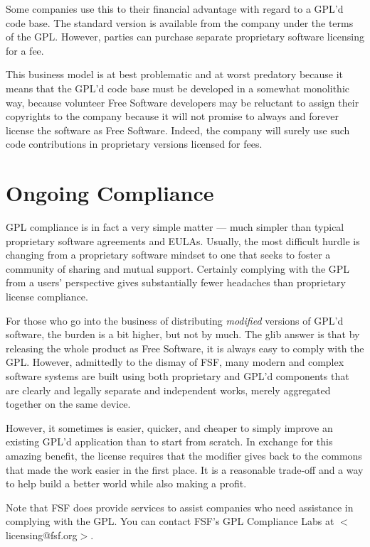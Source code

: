 Some companies use this to their
financial advantage with regard to a GPL'd code base. The standard
version is available from the company under the terms of the GPL\@.
However, parties can purchase separate proprietary software licensing for
a fee.

This business model is at best problematic and at worst predatory because it means that the GPL'd code
base must be developed in a somewhat monolithic way, because volunteer
Free Software developers may be reluctant to assign their copyrights to
the company because it will not promise to always and forever license the
software as Free Software. Indeed, the company will surely use such code
contributions in proprietary versions licensed for fees.

\section{Ongoing Compliance}

GPL compliance is in fact a very simple matter --- much simpler than
typical proprietary software agreements and EULAs. Usually, the most
difficult hurdle is changing from a proprietary software mindset to one
that seeks to foster a community of sharing and mutual support. Certainly
complying with the GPL from a users' perspective gives substantially fewer
headaches than proprietary license compliance.

For those who go into the business of distributing {\em modified}
versions of GPL'd software, the burden is a bit higher, but not by
much. The glib answer is that by releasing the whole product as Free
Software, it is always easy to comply with the GPL. However,
admittedly to the dismay of FSF, many modern and complex software
systems are built using both proprietary and GPL'd components that are
clearly and legally separate and independent works, merely aggregated
together on the same device.

However, it sometimes is easier, quicker, and cheaper to simply
improve an existing GPL'd application than to start from scratch.  In
exchange for this amazing benefit, the license requires that the modifier gives
back to the commons that made the work easier in the first place. It is a
reasonable trade-off and a way to help build a better world while also
making a profit.

Note that FSF does provide services to assist companies who need
assistance in complying with the GPL. You can contact FSF's GPL
Compliance Labs at $<$licensing@fsf.org$>$.

